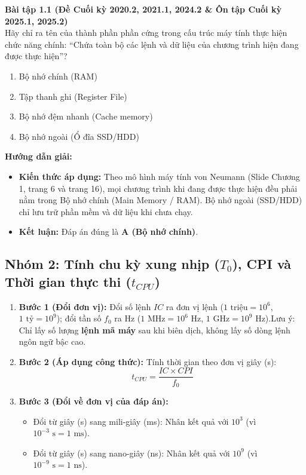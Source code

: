 \textbf{Bài tập 1.1 (Đề Cuối kỳ 2020.2, 2021.1, 2024.2 \& Ôn tập Cuối kỳ 2025.1, 2025.2)}\\
Hãy chỉ ra tên của thành phần phần cứng trong cấu trúc máy tính thực hiện chức năng chính: ``Chứa toàn bộ các lệnh và dữ liệu của chương trình hiện đang được thực hiện''?
\begin{enumerate}[label=\Alph*.]
    \item Bộ nhớ chính (RAM)
    \item Tập thanh ghi (Register File)
    \item Bộ nhớ đệm nhanh (Cache memory)
    \item Bộ nhớ ngoài (Ổ đĩa SSD/HDD)
\end{enumerate}
\textbf{Hướng dẫn giải:}
\begin{itemize}
    \item \textbf{Kiến thức áp dụng:} Theo mô hình máy tính von Neumann (Slide Chương 1, trang 6 và trang 16), mọi chương trình khi đang được thực hiện đều phải nằm trong Bộ nhớ chính (Main Memory / RAM). Bộ nhớ ngoài (SSD/HDD) chỉ lưu trữ phần mềm và dữ liệu khi chưa chạy.
    \item \textbf{Kết luận:} Đáp án đúng là \textbf{A (Bộ nhớ chính)}.
\end{itemize}

\subsection{Nhóm 2: Tính chu kỳ xung nhịp ($T_0$), CPI và Thời gian thực thi ($t_{CPU}$)}

\begin{tcolorbox}[bwbox, title=Quy trình 3 bước giải bài toán tính thời gian thực thi của CPU]
\begin{enumerate}
    \item \textbf{Bước 1 (Đổi đơn vị):} Đổi số lệnh $IC$ ra đơn vị lệnh ($1\text{ triệu} = 10^6$, $1\text{ tỷ} = 10^9$); đổi tần số $f_0$ ra Hz ($1\text{ MHz} = 10^6\text{ Hz}$, $1\text{ GHz} = 10^9\text{ Hz}$).Lưu ý: Chỉ lấy số lượng \textbf{lệnh mã máy} sau khi biên dịch, không lấy số dòng lệnh ngôn ngữ bậc cao.
    \item \textbf{Bước 2 (Áp dụng công thức):} Tính thời gian theo đơn vị giây (s):
    $$t_{CPU} = \frac{IC \times CPI}{f_0}$$
    \item \textbf{Bước 3 (Đổi về đơn vị của đáp án):}
    \begin{itemize}
        \item Đổi từ giây (s) sang mili-giây (ms): Nhân kết quả với $10^3$ (vì $10^{-3}\text{ s} = 1\text{ ms}$).
        \item Đổi từ giây (s) sang nano-giây (ns): Nhân kết quả với $10^9$ (vì $10^{-9}\text{ s} = 1\text{ ns}$).
    \end{itemize}
\end{enumerate}
\end{tcolorbox}

